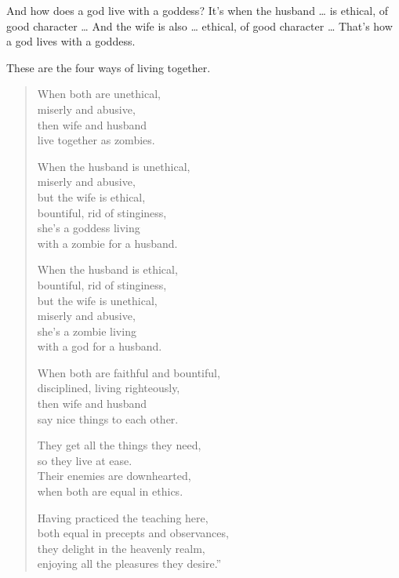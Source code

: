 \documentclass[12pt,openany]{book}%
\begin{document}
And how does a god live with a goddess? It’s when the husband … is ethical, of good character … And the wife is also … ethical, of good character … That’s how a god lives with a goddess. 

These are the four ways of living together. 

\begin{verse}%
When both are unethical, \\
miserly and abusive, \\
then wife and husband \\
live together as zombies. 

When the husband is unethical, \\
miserly and abusive, \\
but the wife is ethical, \\
bountiful, rid of stinginess, \\
she’s a goddess living \\
with a zombie for a husband. 

When the husband is ethical, \\
bountiful, rid of stinginess, \\
but the wife is unethical, \\
miserly and abusive, \\
she’s a zombie living \\
with a god for a husband. 

When both are faithful and bountiful, \\
disciplined, living righteously, \\
then wife and husband \\
say nice things to each other. 

They get all the things they need, \\
so they live at ease. \\
Their enemies are downhearted, \\
when both are equal in ethics. 

Having practiced the teaching here, \\
both equal in precepts and observances, \\
they delight in the heavenly realm, \\
enjoying all the pleasures they desire.” 

%
\end{verse}

%
\end{document}
